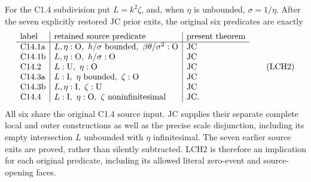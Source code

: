 For the C1.4 subdivision put \(L=k^2\zeta\), and, when
\(\eta\) is unbounded, \(\sigma=1/\eta\).
After the seven explicitly restored JC prior exits, the
original six predicates are exactly
\[
\begin{array}{l|l|l}
\text{label}&\text{retained source predicate}&\text{present theorem}\\ \hline
{\rm C14.1a}&L,\eta:{\rm O},\ h/\sigma\text{ bounded},
                  \ \beta\theta/\sigma^2:{\rm O}&{\rm JC}\\
{\rm C14.1b}&L,\eta:{\rm O},\ h/\sigma:{\rm O}&{\rm JC}\\
{\rm C14.2}&L:{\rm U},\ \eta:{\rm O}&{\rm JC}\\
{\rm C14.3a}&L:{\rm I},\ \eta\text{ bounded},\ \zeta:{\rm O}&{\rm JC}\\
{\rm C14.3b}&L,\eta:{\rm I},\ \zeta:{\rm U}&{\rm JC}\\
{\rm C14.4}&L:{\rm I},\ \eta:{\rm O},
                         \ \zeta\text{ noninfinitesimal}&{\rm JC}.
\end{array}\tag{LCH2}
\]
All six share the original C1.4 source input.  JC supplies
their separate complete local and outer constructions as
well as the precise scale disjunction, including its empty
intersection \(L\) unbounded with \(\eta\) infinitesimal.
The seven earlier source exits are proved, rather than
silently subtracted.  LCH2 is therefore an implication for
each original predicate, including its allowed literal
zero-event and source-opening faces.

